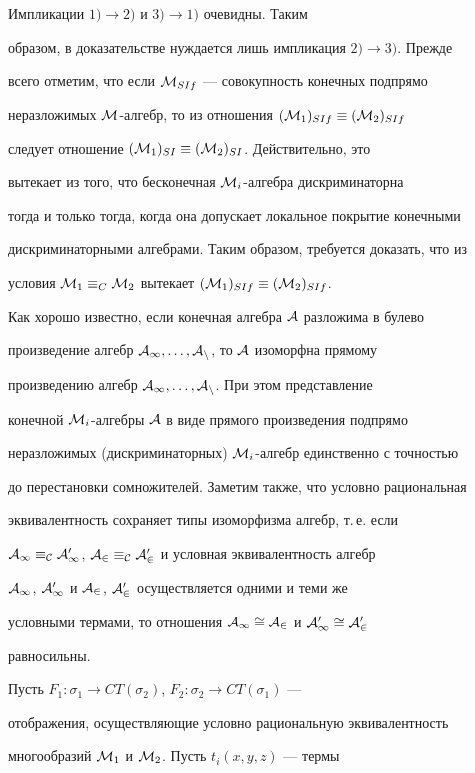 \begin{pf} Импликации $1)\to 2)$ и $3)\to 1)$ очевидны. Таким


образом, в доказательстве нуждается лишь импликация $2)\to 3)$. Прежде


всего отметим, что если ${\cal M}_{SIf}$ --- совокупность конечных подпрямо


неразложимых ${\cal M}$-алгебр, то из отношения $({\cal M}_1)_{SIf}\equiv ({\cal M}_2)_{SIf}$


следует отношение $({\cal M}_1)_{SI}\equiv ({\cal M}_2)_{SI}$. Действительно, это


вытекает из того, что бесконечная ${\cal M}_i$-алгебра дискриминаторна


тогда и только тогда, когда она допускает локальное покрытие конечными


дискриминаторными алгебрами. Таким образом, требуется доказать, что из


условия ${\cal M}_1\equiv_C{\cal M}_2$ вытекает $({\cal M}_1)_{SIf}\equiv ({\cal M}_2)_{SIf}$.


Как хорошо известно, если конечная алгебра $\cal A$ разложима в булево


произведение алгебр $\cal A_1,\dotsc,\cal A_n$, то $\cal A$ изоморфна прямому


произведению алгебр $\cal A_1,\dotsc,\cal A_n$. При этом представление


конечной ${\cal M}_i$-алгебры $\cal A$ в виде прямого произведения подпрямо


неразложимых (дискриминаторных) ${\cal M}_i$-алгебр единственно с точностью


до перестановки сомножителей. Заметим также, что условно рациональная


эквивалентность сохраняет типы изоморфизма алгебр, т.\,е. если


$\cal A_1\equiv_C\cal A'_1$, $\cal A_2\equiv_C\cal A'_2$ и условная эквивалентность алгебр


$\cal A_1$, $\cal A'_1$ и $\cal A_2$, $\cal A'_2$ осуществляется одними и теми же


условными термами, то отношения $\cal A_1\cong\cal A_2$ и $\cal A'_1\cong\cal A'_2$


равносильны.





Пусть $F_1:\sigma_1\to CT(\sigma_2)$, $F_2:\sigma_2\to CT(\sigma_1)$ ---


отображения, осуществляющие условно рациональную эквивалентность


многообразий ${\cal M}_1$ и ${\cal M}_2$. Пусть $t_i(x,y,z)$ --- термы



\end{pf}
